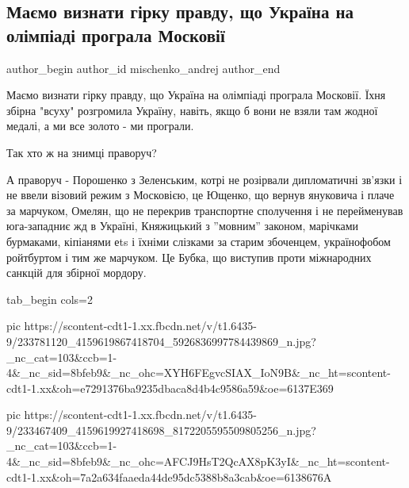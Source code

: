  
 
 
 
 
 
\subsection{Маємо визнати гірку правду, що Україна на олімпіаді програла Московії}
\label{sec:08_08_2021.fb.mischenko_andrej.1.maguchih_moskovia_ukraina}
 
\ifcmt
 author_begin
   author_id mischenko_andrej
 author_end
\fi

Маємо визнати гірку правду, що Україна на олімпіаді програла Московії. Їхня
збірна "всуху" розгромила Україну, навіть, якщо б вони не взяли там жодної
медалі, а ми все золото - ми програли. 

Так хто ж на знимці праворуч? 

А праворуч - Порошенко з Зеленським, котрі не розірвали дипломатичні зв'язки і
не ввели візовий режим з Московією, це Ющенко, що вернув януковича і плаче за
марчуком, Омелян, що не перекрив транспортне сполучення і не перейменував
юга-западниє жд в Україні, Княжицький з ''мовним'' законом, марічками
бурмаками, кіпіанями еts і їхніми слізками за старим збоченцем, українофобом
ройтбуртом і тим же марчуком. Це Бубка, що виступив проти міжнародних санкцій
для збірної мордору.

\ifcmt
  tab_begin cols=2

     pic https://scontent-cdt1-1.xx.fbcdn.net/v/t1.6435-9/233781120_4159619867418704_5926836997784439869_n.jpg?_nc_cat=103&ccb=1-4&_nc_sid=8bfeb9&_nc_ohc=XYH6FEgvcSIAX_IoN9B&_nc_ht=scontent-cdt1-1.xx&oh=e7291376ba9235dbaca8d4b4c9586a59&oe=6137E369

     pic https://scontent-cdt1-1.xx.fbcdn.net/v/t1.6435-9/233467409_4159619927418698_8172205595509805256_n.jpg?_nc_cat=103&ccb=1-4&_nc_sid=8bfeb9&_nc_ohc=AFCJ9HsT2QcAX8pK3yI&_nc_ht=scontent-cdt1-1.xx&oh=7a2a634faaeda44de95dc5388b8a3cab&oe=6138676A

